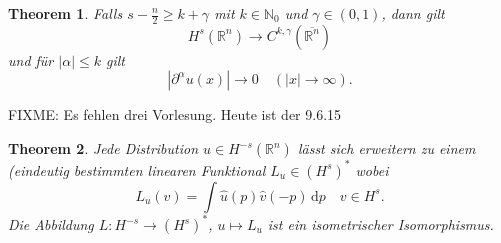 \documentclass[
paper=a4,
bibtotocnumbered,
liststotocnumbered,
tablecaptionabove,
pointlessnumbers,
twoside,
openright,
10pt
]
{report}
\newtheorem{thm}{Theorem}[chapter]
\theoremstyle{definition}
\numberwithin{equation}{chapter}
\begin{document}
\begin{thm}
Falls $s- \frac{n}{2}\ge k +\gamma$ mit $k\in \mathbb N_0$ und $\gamma \in (0,1)$, dann gilt
\begin{equation}
H^s(\mathbb R^n) \to C^{k,\gamma}(\overline{\mathbb R^n})
\end{equation}
und für $|\alpha|\le k$ gilt
\begin{equation}
|\partial^\alpha u(x)|\to 0 \quad (|x|\to \infty).
\end{equation}
\end{thm}

FIXME: Es fehlen drei Vorlesung. Heute ist der 9.6.15
\setcounter{thm}{5}
\begin{thm}\label{4.6}
Jede Distribution $u\in H^{-s}(\mathbb R^n)$ lässt sich erweitern zu einem (eindeutig bestimmten linearen Funktional $L_u \in (H^s)^*$ wobei 
\begin{equation}
L_u(v) = \int \hat u(p) \hat v(-p)\, \mathrm dp \quad v\in H^s.
\end{equation}
Die Abbildung $L: H^{-s}\to (H^s)^*$, $u\mapsto L_u$ ist ein isometrischer Isomorphismus. 
\end{thm}
\end{document}
